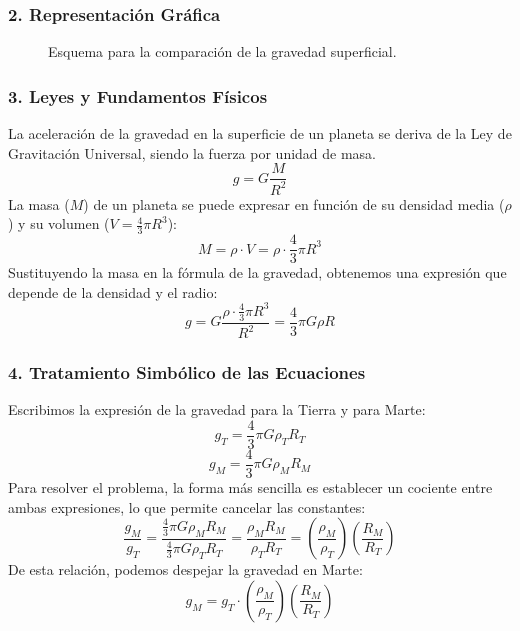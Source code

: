 \subsubsection*{2. Representación Gráfica}
\begin{figure}[H]
    \centering
    \caption{Esquema para la comparación de la gravedad superficial.}
\end{figure}

\subsubsection*{3. Leyes y Fundamentos Físicos}
La aceleración de la gravedad en la superficie de un planeta se deriva de la Ley de Gravitación Universal, siendo la fuerza por unidad de masa.
$$ g = G \frac{M}{R^2} $$
La masa ($M$) de un planeta se puede expresar en función de su densidad media ($\rho$) y su volumen ($V = \frac{4}{3}\pi R^3$):
$$ M = \rho \cdot V = \rho \cdot \frac{4}{3}\pi R^3 $$
Sustituyendo la masa en la fórmula de la gravedad, obtenemos una expresión que depende de la densidad y el radio:
$$ g = G \frac{\rho \cdot \frac{4}{3}\pi R^3}{R^2} = \frac{4}{3}\pi G \rho R $$

\subsubsection*{4. Tratamiento Simbólico de las Ecuaciones}
Escribimos la expresión de la gravedad para la Tierra y para Marte:
$$ g_T = \frac{4}{3}\pi G \rho_T R_T $$
$$ g_M = \frac{4}{3}\pi G \rho_M R_M $$
Para resolver el problema, la forma más sencilla es establecer un cociente entre ambas expresiones, lo que permite cancelar las constantes:
$$ \frac{g_M}{g_T} = \frac{\frac{4}{3}\pi G \rho_M R_M}{\frac{4}{3}\pi G \rho_T R_T} = \frac{\rho_M R_M}{\rho_T R_T} = \left(\frac{\rho_M}{\rho_T}\right) \left(\frac{R_M}{R_T}\right) $$
De esta relación, podemos despejar la gravedad en Marte:
$$ g_M = g_T \cdot \left(\frac{\rho_M}{\rho_T}\right) \left(\frac{R_M}{R_T}\right) $$

